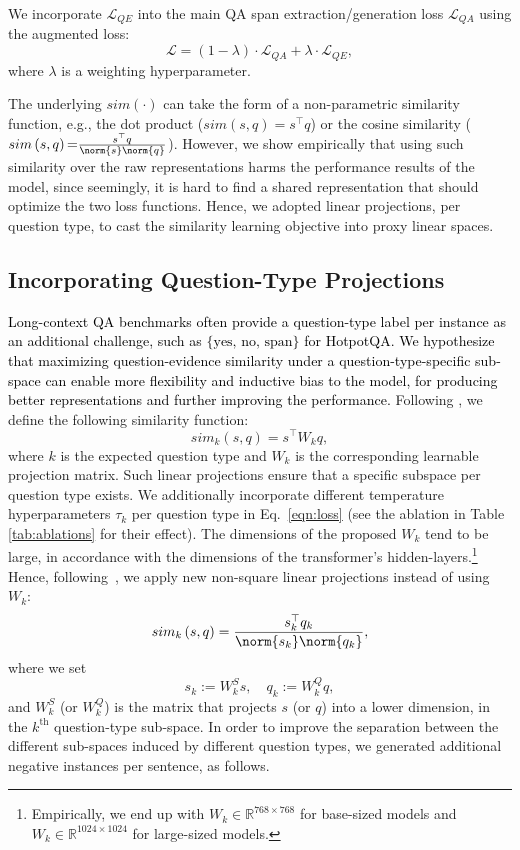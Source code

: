 \documentclass[11pt,a4paper]{article}
\newcommand{\red}[1]{\textcolor{black}{#1}}
\begin{document}
We incorporate $\mathcal{L}_{QE}$ into the main QA span extraction/generation loss $\mathcal{L}_{QA}$ using the augmented loss:
\begin{equation*}
{\mathcal{L}=(1-\lambda)\cdot\mathcal{L}_{QA}+\lambda\cdot\mathcal{L}_{QE},}
\end{equation*}
where $\lambda$ is a weighting hyperparameter. 


The underlying $sim(\cdot)$ can take the form of a non-parametric similarity function, e.g., the dot product ($sim\left(s, q\right){=}s^\top q$) or the cosine similarity ($sim\left(s, q\right){=}\frac{s^\top q}{\norm{s}\norm{q}}$). However, we show empirically that using such similarity over the raw representations harms the performance results of the model, since seemingly, it is hard to find a shared representation that should optimize the two loss functions. Hence, we adopted linear projections, per question type, to cast the similarity learning objective into proxy linear spaces.




\subsection{Incorporating Question-Type Projections}
\label{subsec:qt_aware}
\red{Long-context QA benchmarks often provide a question-type label per instance as an additional challenge, such as ${\text{\{yes, no, span\}}}$ for HotpotQA. We hypothesize that maximizing question-evidence similarity under a question-type-specific sub-space can enable more flexibility and inductive bias to the model, for producing better representations and further improving the performance.}
Following \citet{iter-etal-2020-pretraining}, we define the following similarity function:
\begin{equation}
sim_k\left(s,q\right)=s^\top W_k q,
\label{eq:first_s}
\end{equation}
where $k$ is the expected question type and $W_k$ is the corresponding learnable projection matrix. Such linear projections ensure that a specific subspace per question type exists. We additionally incorporate different temperature hyperparameters $\tau_k$ per question type in Eq.~\ref{eqn:loss} (see the ablation in Table \ref{tab:ablations} for their effect). %
The dimensions of the proposed $W_k$ tend to be large, in accordance with the dimensions of the transformer's hidden-layers.\footnote{Empirically, we end up with $W_k\in\mathbb{R}^{768\times768}$ for base-sized models and $W_k\in\mathbb{R}^{1024 \times1024}$ for large-sized models.} Hence, following~\citet{barkan-etal-2020-within}, we apply new non-square linear projections instead of using $W_k$:
\begin{equation}
sim_k\left(s,q\right)=\frac{s_k^\top q_k}{\norm{s_k}\norm{q_k}},
\label{eq:cos_k}
\end{equation}
where we set $$s_k{:=}W^S_{k}s,\quad
q_k{:=}W^Q_{k}q,$$ and
$W^S_{k}$ (or $W^Q_{k}$) is the matrix that projects $s$ (or $q$) into a lower dimension, in the $k^\text{th}$ question-type sub-space. 
In order to improve the separation between the different sub-spaces induced by different question types, we generated additional negative instances per sentence, as follows. 
\end{document}
